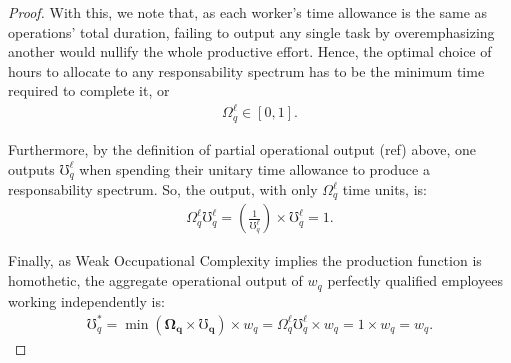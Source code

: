 \documentclass[hidelinks, nonatbib]{elsarticle}
\begin{document}
\begin{lemma}
\begin{proof}
        With this, we note that, as each worker's time allowance is the same as operations' total duration, failing to output any single task by overemphasizing another would nullify the whole productive effort. Hence, the optimal choice of hours to allocate to any responsability spectrum has to be the minimum time required to complete it, or
        \begin{gather}
            \Omega_{q}^{\ell} 
            \in
            [0,1]
            .
        \end{gather}
        
        Furthermore, by the definition of partial operational output (ref) above, one outputs $\mho_{q}^{\ell}$ when spending their unitary time allowance to produce a responsability spectrum. So, the output, with only $\Omega_{q}^{\ell}$ time units, is:
        \begin{gather}
            \Omega_{q}^{\ell}
            \mho_{q}^{\ell}
            =
            \left(
                \frac{1}{\mho_{q}^{\ell}}
            \right)
            \times
            \mho_{q}^{\ell}
            =
            1
            .
        \end{gather}
        
        Finally, as Weak Occupational Complexity implies the production function is homothetic, the aggregate operational output of $w_q$ perfectly qualified employees working independently is:
        \begin{gather}
            \mho_{q}^{*}
            =
            \min(
                \boldsymbol{\Omega_q}
                \times
                \boldsymbol{\mho_q}
            )
            \times
            w_q
            =
            \Omega_{q}^{\ell}
            \mho_{q}^{\ell}
            \times
            w_q
            =
            1
            \times
            w_q
            =
            w_q
            .
        \end{gather}
        

\end{proof}
\end{lemma}
\end{document}
